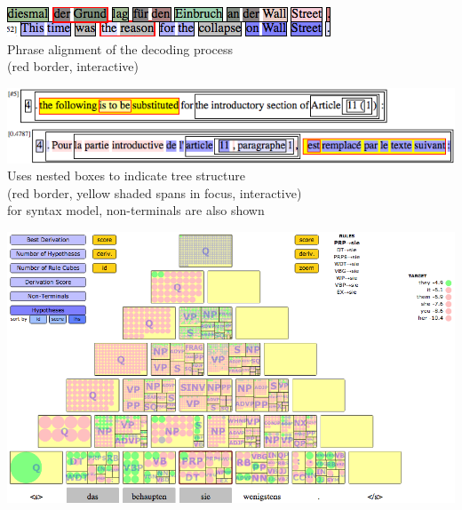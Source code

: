 \documentclass[landscape]{uedslides2C}
\begin{document}
\vspace{30mm}
\begin{center}
\includegraphics[scale=1.5]{analysis-alignment.png}\\[10mm]
Phrase alignment of the decoding process\\[5mm]
(red border, interactive)
\end{center}


\vspace{15mm}
\begin{center}
\includegraphics[scale=1.2]{analysis-tree-alignment.png}\\[10mm]
Uses nested boxes to indicate tree structure\\[3mm]
(red border, yellow shaded spans in focus, interactive)\\[3mm]
for syntax model, non-terminals are also shown
\end{center}




\slide{}
\vspace{-2.5cm}
\begin{center}
\includegraphics[width=26cm]{ems-syntax-viz.png}
\end{center}
\end{document}
